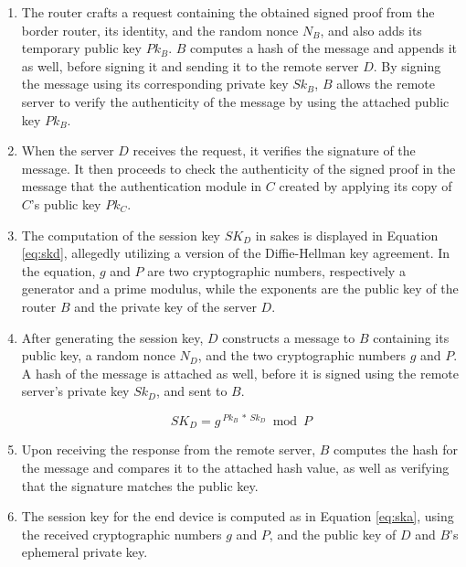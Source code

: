 \begin{enumerate}

\item The router crafts a request containing the obtained signed proof from the border router, its identity, and the random nonce $N_B$, and also adds its temporary public key $Pk_B$.  $B$ computes a hash of the message and appends it as well, before signing it and sending it to the remote server $D$. By signing the message using its corresponding private key $Sk_B$, $B$ allows the remote server to verify the authenticity of the message by using the attached public key $Pk_B$.

\item When the server $D$ receives the request, it verifies the signature of the message. It then proceeds to check the authenticity of the signed proof in the message that the authentication module in $C$ created by applying its copy of $C$'s public key $Pk_C$.

\item The computation of the session key $SK_D$ in \gls{sakes} is displayed in Equation \ref{eq:skd}, allegedly utilizing a version of the Diffie-Hellman key agreement. In the equation, $g$ and $P$ are two cryptographic numbers, respectively a generator and a prime modulus, while the exponents are the public key of the router $B$ and the private key of the server $D$.

\item After generating the session key, $D$ constructs a message to $B$ containing its public key, a random nonce $N_D$, and the two cryptographic numbers $g$ and $P$. A hash of the message is attached as well, before it is signed using the remote server's private key $Sk_D$, and sent to $B$.

\begin{equation}
\label{eq:skd}
SK_D = g^{\ Pk_{B}\ *\ Sk_D} \bmod P
\end{equation}

\item Upon receiving the response from the remote server, $B$ computes the hash for the message and compares it to the attached hash value, as well as verifying that the signature matches the public key.

\item  The session key for the end device is computed as in Equation \ref{eq:ska}, using the received cryptographic numbers $g$ and $P$, and the public key of $D$ and $B$'s ephemeral private key.


\end{enumerate}
